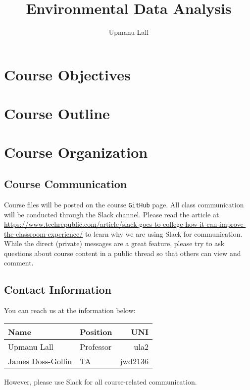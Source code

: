 \documentclass[12pt]{article}
\title{Environmental Data Analysis}
\author{Upmanu Lall}
\begin{document}
\maketitle
\RaggedRight



\section{Course Objectives}

\section{Course Outline}

\section{Course Organization}


\subsection{Course Communication}

Course files will be posted on the course \texttt{GitHub} page.
All class communication will be conducted through the Slack channel.
Please read the article at  \url{https://www.techrepublic.com/article/slack-goes-to-college-how-it-can-improve-the-classroom-experience/} to learn why we are using Slack for communication.
While the direct (private) messages are a great feature, please try to ask questions about course content in a public thread so that others can view and comment.

\subsection{Contact Information}

You can reach us at the information below:
\begin{tabular}{l l r}
  \toprule
  Name & Position & UNI \\
  \midrule
  Upmanu Lall & Professor & ula2 \\
  James Doss-Gollin & TA & jwd2136 \\
  \bottomrule
\end{tabular}

However, please use Slack for all course-related communication.
\end{document}

